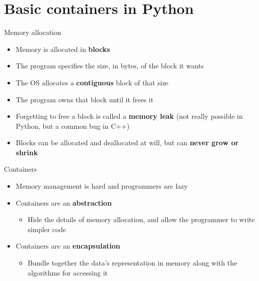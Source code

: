 \part{Basic containers in Python}
\frame{\partpage}

\begin{frame}{Memory allocation}
	\begin{itemize}
		\pause\item Memory is allocated in \textbf{blocks}
		\pause\item The program specifies the size, in bytes, of the block it wants
		\pause\item The OS allocates a \textbf{contiguous} block of that size
		\pause\item The program owns that block until it frees it
		\pause\item Forgetting to free a block is called a \textbf{memory leak}
			(not really possible in Python, but a common bug in C++)
		\pause\item Blocks can be allocated and deallocated at will, but can \textbf{never grow or shrink}
	\end{itemize}
\end{frame}

\begin{frame}{Containers}
	\begin{itemize}
		\pause\item Memory management is hard and programmers are lazy
		\pause\item Containers are an \textbf{abstraction}
			\begin{itemize}
				\pause\item Hide the details of memory allocation, and allow the programmer to write simpler code
			\end{itemize}
		\pause\item Containers are an \textbf{encapsulation}
			\begin{itemize}
				\pause\item Bundle together the data's representation in memory along with the algorithms for accessing it
			\end{itemize}
	\end{itemize}
\end{frame}

